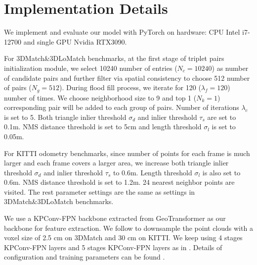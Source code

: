 \documentclass[conference,compsoc]{IEEEtran}
\begin{document}
\section{Implementation Details}
\label{Implementation Details}

We implement and evaluate our model with PyTorch \cite{paszke2019pytorch} on hardware: CPU Intel i7-12700 and single GPU Nvidia RTX3090. 

For 3DMatch\&3DLoMatch benchmarks, at the first stage of triplet pairs initialization module, we select 10240 number of entries (${N_c = 10240}$) as number of candidate pairs and further filter via spatial consistency to choose 512 number of pairs (${N_g = 512}$). During flood fill process, we iterate for 120 (${\lambda_f = 120}$) number of times. We choose neighborhood size to 9 and top 1 (${N_k = 1}$) corresponding pair will be added to each group of pairs. Number of iterations ${\lambda_c}$ is set to 5. Both triangle inlier threshold ${\sigma_d}$ and inlier threshold ${\tau_s}$ are set to 0.1m. NMS distance threshold is set to 5cm and length threshold ${\sigma_l}$ is set to 0.05m.

For KITTI odometry benchmarks, since number of points for each frame is much larger and each frame covers a larger area, we increase both triangle inlier threshold ${\sigma_d}$ and inlier threshold ${\tau_s}$ to 0.6m. Length threshold ${\sigma_l}$ is also set to 0.6m. NMS distance threshold is set to 1.2m. 24 nearest neighbor points are visited. The rest parameter settings are the same as settings in 3DMatch\&3DLoMatch benchmarks.

We use a KPConv-FPN backbone extracted from GeoTransformer as our backbone for feature extraction. We follow \cite{huang2021predator,qin2022geometric} to downsample the point clouds with a voxel size of 2.5 cm on 3DMatch and 30 cm on KITTI. We keep using 4 stages KPConv-FPN layers and 5 stages KPConv-FPN layers as in \cite{qin2022geometric}. Details of configuration and training parameters can be found \cite{qin2022geometric}.
\end{document}
